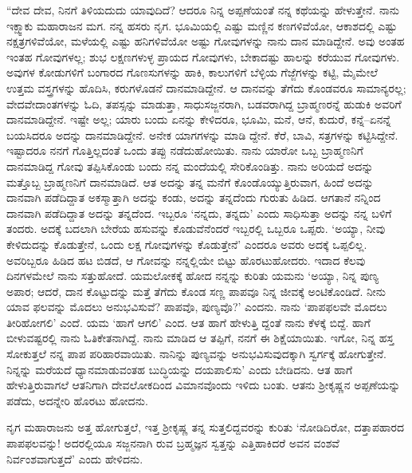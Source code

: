 “ದೇವ ದೇವ, ನಿನಗೆ ತಿಳಿಯದುದು ಯಾವುದಿದೆ? ಆದರೂ ನಿನ್ನ ಅಪ್ಪಣೆಯಂತೆ ನನ್ನ ಕಥೆಯನ್ನು ಹೇಳುತ್ತೇನೆ. ನಾನು ಇಕ್ಷ್ವಾಕು ಮಹಾರಾಜನ ಮಗ. ನನ್ನ ಹಸರು ನೃಗ. ಭೂಮಿಯಲ್ಲಿ ಎಷ್ಟು ಮಣ್ಣಿನ ಕಣಗಳಿವೆಯೋ, ಆಕಾಶದಲ್ಲಿ ಎಷ್ಟು ನಕ್ಷತ್ರಗಳಿವೆಯೋ, ಮಳೆಯಲ್ಲಿ ಎಷ್ಟು ಹನಿಗಳಿವೆಯೋ ಅಷ್ಟು ಗೋವುಗಳನ್ನು ನಾನು ದಾನ ಮಾಡಿದ್ದೇನೆ. ಅವು ಅಂತಹ ಇಂತಹ ಗೋವುಗಳಲ್ಲ; ಶುಭ ಲಕ್ಷಣಗಳುಳ್ಳ ಪ್ರಾಯದ ಗೋವುಗಳು, ಬೇಕಾದಷ್ಟು ಹಾಲನ್ನು ಕರೆಯುವ ಗೋವುಗಳು. ಅವುಗಳ ಕೋಡುಗಳಿಗೆ ಬಂಗಾರದ ಗೊಣಸುಗಳನ್ನು ಹಾಕಿ, ಕಾಲುಗಳಿಗೆ ಬೆಳ್ಳಿಯ ಗೆಜ್ಜೆಗಳನ್ನು ಕಟ್ಟಿ, ಮೈಮೇಲೆ ಉತ್ತಮ ವಸ್ತ್ರಗಳನ್ನು ಹೊದಿಸಿ, ಕರುಗಳೊಡನೆ ದಾನಮಾಡಿದ್ದೇನೆ. ಆ ದಾನವನ್ನು ತೆಗೆದು ಕೊಂಡವರೂ ಸಾಮಾನ್ಯರಲ್ಲ; ವೇದವೇದಾಂತಗಳನ್ನು ಓದಿ, ತಪಸ್ಸನ್ನು ಮಾಡುತ್ತಾ, ಸಾಧುಸಜ್ಜನರಾಗಿ, ಬಡವರಾಗಿದ್ದ ಬ್ರಾಹ್ಮಣರನ್ನೆ ಹುಡುಕಿ ಅವರಿಗೆ ದಾನಮಾಡಿದ್ದೇನೆ. ಇಷ್ಟೇ ಅಲ್ಲ; ಯಾರು ಬಂದು ಏನನ್ನು ಕೇಳಿದರೂ, ಭೂಮಿ, ಮನೆ, ಆನೆ, ಕುದುರೆ, ಕನ್ನೆ–ಏನನ್ನೆ ಬಯಸಿದರೂ ಅದನ್ನು ದಾನಮಾಡಿದ್ದೇನೆ. ಅನೇಕ ಯಾಗಗಳನ್ನು ಮಾಡಿ ದ್ದೇನೆ. ಕೆರೆ, ಬಾವಿ, ಸತ್ರಗಳನ್ನು ಕಟ್ಟಿಸಿದ್ದೇನೆ. ಇಷ್ಟಾದರೂ ನನಗೆ ಗೊತ್ತಿಲ್ಲದಂತೆ ಒಂದು ತಪ್ಪು ನಡೆದುಹೋಯಿತು. ನಾನು ಯಾರೋ ಒಬ್ಬ ಬ್ರಾಹ್ಮಣನಿಗೆ ದಾನಮಾಡಿದ್ದ ಗೋವು ತಪ್ಪಿಸಿಕೊಂಡು ಬಂದು ನನ್ನ ಮಂದೆಯಲ್ಲಿ ಸೇರಿಕೊಂಡಿತ್ತು. ನಾನು ಅರಿಯದೆ ಅದನ್ನು ಮತ್ತೊಬ್ಬ ಬ್ರಾಹ್ಮಣನಿಗೆ ದಾನಮಾಡಿದೆ. ಆತ ಅದನ್ನು ತನ್ನ ಮನೆಗೆ ಕೊಂಡೊಯ್ಯುತ್ತಿರುವಾಗ, ಹಿಂದೆ ಅದನ್ನು ದಾನವಾಗಿ ಪಡೆದಿದ್ದಾತ ಅಕಸ್ಮಾತ್ತಾಗಿ ಅದನ್ನು ಕಂಡು, ಅದನ್ನು ತನ್ನದೆಂದು ಗುರುತು ಹಿಡಿದ. ಆಗತಾನೆ ನನ್ನಿಂದ ದಾನವಾಗಿ ಪಡೆದಿದ್ದಾತ ಅದನ್ನು ತನ್ನದೆಂದ. ಇಬ್ಬರೂ ‘ನನ್ನದು, ತನ್ನದು’ ಎಂದು ಸಾಧಿಸುತ್ತಾ ಅದನ್ನು ನನ್ನ ಬಳಿಗೆ ತಂದರು. ಅದಕ್ಕೆ ಬದಲಾಗಿ ಬೇರೆಯ ಹಸುವನ್ನು ಕೊಡುವೆನೆಂದರೆ ಇಬ್ಬರಲ್ಲಿ ಒಬ್ಬರೂ ಒಪ್ಪರು. ‘ಅಯ್ಯಾ, ನೀವು ಕೇಳಿದುದನ್ನು ಕೊಡುತ್ತೇನೆ, ಒಂದು ಲಕ್ಷ ಗೋವುಗಳನ್ನು ಕೊಡುತ್ತೇನೆ’ ಎಂದರೂ ಅವರು ಅದಕ್ಕೆ ಒಪ್ಪಲಿಲ್ಲ. ಅವರಿಬ್ಬರೂ ಹಿಡಿದ ಹಟ ಬಿಡದೆ, ಆ ಗೋವನ್ನು ನನ್ನಲ್ಲಿಯೇ ಬಿಟ್ಟು ಹೊರಟುಹೋದರು. ಇದಾದ ಕೆಲವು ದಿನಗಳಮೇಲೆ ನಾನು ಸತ್ತುಹೋದೆ. ಯಮಲೋಕಕ್ಕೆ ಹೋದ ನನ್ನನ್ನು ಕುರಿತು ಯಮನು ‘ಅಯ್ಯಾ, ನಿನ್ನ ಪುಣ್ಯ ಅಪಾರ; ಆದರೆ, ದಾನ ಕೊಟ್ಟುದನ್ನು ಮತ್ತೆ ತೆಗೆದು ಕೊಂಡ ಸಣ್ಣ ಪಾಪವೂ ನಿನ್ನ ಜೀವಕ್ಕೆ ಅಂಟಿಕೊಂಡಿದೆ. ನೀನು ಯಾವ ಫಲವನ್ನು ಮೊದಲು ಅನುಭವಿಸುವೆ? ಪಾಪವೊ, ಪುಣ್ಯವೊ?’ ಎಂದನು. ನಾನು ‘ಪಾಪಫಲವೇ ಮೊದಲು ತೀರಿಹೋಗಲಿ’ ಎಂದೆ. ಯಮ ‘ಹಾಗೆ ಆಗಲಿ’ ಎಂದ. ಆತ ಹಾಗೆ ಹೇಳುತ್ತಿ ದ್ದಂತೆ ನಾನು ಕೆಳಕ್ಕೆ ಬಿದ್ದೆ. ಹಾಗೆ ಬೀಳುವಷ್ಟರಲ್ಲಿ ನಾನು ಓತಿಕೇತನಾಗಿದ್ದೆ. ನಾನು ಮಾಡಿದ ಆ ತಪ್ಪಿಗೆ, ನನಗೆ ಈ ಶಿಕ್ಷೆಯಾಯಿತು. ಇಗೋ, ನಿನ್ನ ಹಸ್ತ ಸೋಕುತ್ತಲೆ ನನ್ನ ಪಾಪ ಪರಿಹಾರವಾಯಿತು. ನಾನಿನ್ನು ಪುಣ್ಯವನ್ನು ಅನುಭವಿಸುವುದಕ್ಕಾಗಿ ಸ್ವರ್ಗಕ್ಕೆ ಹೋಗುತ್ತೇನೆ. ನಿನ್ನನ್ನು ಮರೆಯದೆ ಧ್ಯಾನಮಾಡುವಂತಹ ಬುದ್ಧಿಯನ್ನು ದಯಪಾಲಿಸು’ ಎಂದು ಬೇಡಿದನು. ಆತ ಹಾಗೆ ಹೇಳುತ್ತಿರುವಾಗಲೆ ಆತನಿಗಾಗಿ ದೇವಲೋಕದಿಂದ ವಿಮಾನವೊಂದು ಇಳಿದು ಬಂತು. ಆತನು ಶ್ರೀಕೃಷ್ಣನ ಅಪ್ಪಣೆಯನ್ನು ಪಡೆದು, ಅದನ್ನೇರಿ ಹೊರಟು ಹೋದನು.

ನೃಗ ಮಹಾರಾಜನು ಅತ್ತ ಹೋಗುತ್ತಲೆ, ಇತ್ತ ಶ್ರೀಕೃಷ್ಣ ತನ್ನ ಸುತ್ತಲಿದ್ದವರನ್ನು ಕುರಿತು ‘ನೋಡಿದಿರೋ, ದತ್ತಾಪಹಾರದ ಪಾಪಫಲವನ್ನು! ಅದರಲ್ಲಿಯೂ ಸಜ್ಜನನಾಗಿ ರುವ ಬ್ರಹ್ಮಜ್ಞನ ಸ್ವತ್ತನ್ನು ಎತ್ತಿಹಾಕಿದರೆ ಅವನ ವಂಶವೆ ನಿರ್ವಂಶವಾಗುತ್ತದೆ’ ಎಂದು ಹೇಳಿದನು.

